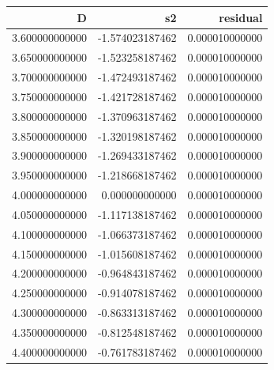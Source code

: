 \begin{tabular}{rrr}
\toprule
D & s2 & residual \\
\midrule
3.600000000000 & -1.574023187462 & 0.000010000000 \\
3.650000000000 & -1.523258187462 & 0.000010000000 \\
3.700000000000 & -1.472493187462 & 0.000010000000 \\
3.750000000000 & -1.421728187462 & 0.000010000000 \\
3.800000000000 & -1.370963187462 & 0.000010000000 \\
3.850000000000 & -1.320198187462 & 0.000010000000 \\
3.900000000000 & -1.269433187462 & 0.000010000000 \\
3.950000000000 & -1.218668187462 & 0.000010000000 \\
4.000000000000 & 0.000000000000 & 0.000010000000 \\
4.050000000000 & -1.117138187462 & 0.000010000000 \\
4.100000000000 & -1.066373187462 & 0.000010000000 \\
4.150000000000 & -1.015608187462 & 0.000010000000 \\
4.200000000000 & -0.964843187462 & 0.000010000000 \\
4.250000000000 & -0.914078187462 & 0.000010000000 \\
4.300000000000 & -0.863313187462 & 0.000010000000 \\
4.350000000000 & -0.812548187462 & 0.000010000000 \\
4.400000000000 & -0.761783187462 & 0.000010000000 \\
\bottomrule
\end{tabular}
